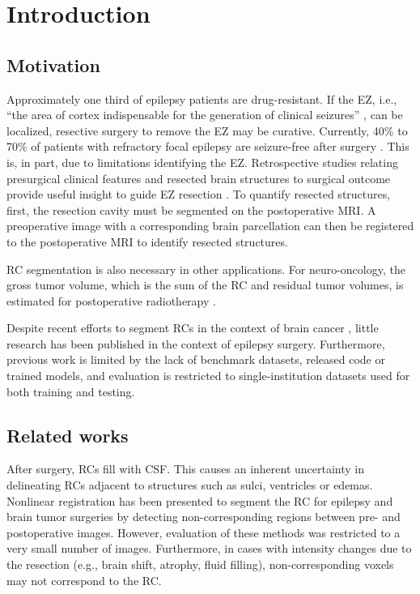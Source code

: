 \section{Introduction}

\subsection{Motivation}

Approximately one third of epilepsy patients are drug-resistant.
If the \ac{EZ}, i.e., ``the area of cortex indispensable for the generation of clinical seizures'' \cite{rosenow_presurgical_2001}, can be localized, resective surgery to remove the \ac{EZ} may be curative.
Currently, 40\% to 70\% of patients with refractory focal epilepsy are seizure-free after surgery \cite{jobst_resective_2015}.
This is, in part, due to limitations identifying the \ac{EZ}.
Retrospective studies relating presurgical clinical features and resected brain structures to surgical outcome provide useful insight to guide \ac{EZ} resection \cite{jobst_resective_2015}.
To quantify resected structures, first, the resection cavity must be segmented on the postoperative \ac{MRI}.
A preoperative image with a corresponding brain parcellation can then be registered to the postoperative \ac{MRI} to identify resected structures.

\Ac{RC} segmentation is also necessary in other applications.
For neuro-oncology, the gross tumor volume, which is the sum of the \ac{RC} and residual tumor volumes, is estimated for postoperative radiotherapy \cite{ermis_fully_2020}.

Despite recent efforts to segment \acp{RC} in the context of brain cancer \cite{meier_automatic_2017,ermis_fully_2020}, little research has been published in the context of epilepsy surgery.
Furthermore, previous work is limited by the lack of benchmark datasets, released code or trained models, and evaluation is restricted to single-institution datasets used for both training and testing.


\subsection{Related works}

After surgery, \acp{RC} fill with \ac{CSF}.
This causes an inherent uncertainty in delineating \acp{RC} adjacent to structures such as sulci, ventricles or edemas.
Nonlinear registration has been presented to segment the \ac{RC} for epilepsy \cite{chitphakdithai_non-rigid_2010} and brain tumor \cite{chen_deformable_2015} surgeries by detecting non-corresponding regions between pre- and postoperative images.
However, evaluation of these methods was restricted to a very small number of images.
Furthermore, in cases with intensity changes due to the resection (e.g., brain shift, atrophy, fluid filling), non-corresponding voxels may not correspond to the \ac{RC}.

